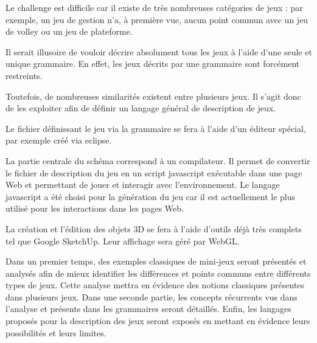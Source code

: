 Le challenge est difficile car il existe de très nombreuses catégories de jeux : 
par exemple, un jeu de gestion n'a, à première vue, aucun point commun avec un jeu de volley ou un jeu de plateforme.

Il serait illusoire de vouloir décrire absolument tous les jeux à l'aide d'une seule et unique grammaire.
En effet, les jeux décrits par une grammaire sont forcément restreints.

Toutefois, de nombreuses similarités existent entre plusieurs jeux. Il s'agit donc de les exploiter afin de définir un langage général de description de jeux.

Le fichier définissant le jeu via la grammaire se fera à l'aide d'un éditeur spécial, par exemple créé via eclipse.

\vspace{0.5cm}

La partie centrale du schéma correspond à un compilateur.
Il permet de convertir le fichier de description du jeu en un script javascript exécutable dans une page Web et permettant de jouer et 
interagir avec l'environnement.
Le langage javascript a été choisi pour la génération du jeu car il est actuellement le plus utilisé pour les interactions dans les pages Web.

La création et l'édition des objets 3D se fera à l'aide d'outils déjà très complets tel que Google SketchUp.
Leur affichage sera géré par WebGL.

\vspace{0.5cm}

Dans un premier temps, des exemples classiques de mini-jeux seront présentés et analysés afin de mieux identifier
les différences et points communs entre différents types de jeux. Cette analyse mettra en évidence des notions classiques
présentes dans plusieurs jeux.
Dans une seconde partie, les concepts récurrents vus dans l'analyse et présents dans les grammaires seront détaillés.
Enfin, les langages proposés pour la description des jeux seront exposés en mettant en évidence leurs possibilités et leurs limites.
